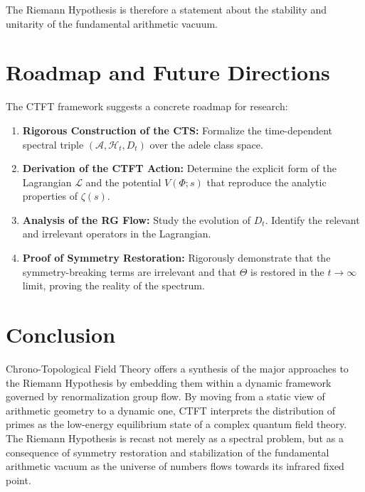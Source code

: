 \documentclass[11pt, a4paper]{article}
\theoremstyle{definition}
\newcommand{\Lagr}{\mathcal{L}}
\newcommand{\Hilb}{\mathcal{H}}
\newcommand{\Alg}{\mathscr{A}}
\begin{document}
The Riemann Hypothesis is therefore a statement about the stability and unitarity of the fundamental arithmetic vacuum.

\section{Roadmap and Future Directions}
The CTFT framework suggests a concrete roadmap for research:
\begin{enumerate}
    \item \textbf{Rigorous Construction of the CTS:} Formalize the time-dependent spectral triple $(\Alg, \Hilb_t, D_t)$ over the adele class space.
    \item \textbf{Derivation of the CTFT Action:} Determine the explicit form of the Lagrangian $\Lagr$ and the potential $V(\Phi; s)$ that reproduce the analytic properties of $\zeta(s)$.
    \item \textbf{Analysis of the RG Flow:} Study the evolution of $D_t$. Identify the relevant and irrelevant operators in the Lagrangian.
    \item \textbf{Proof of Symmetry Restoration:} Rigorously demonstrate that the symmetry-breaking terms are irrelevant and that $\Theta$ is restored in the $t\to\infty$ limit, proving the reality of the spectrum.
\end{enumerate}

\section{Conclusion}
Chrono-Topological Field Theory offers a synthesis of the major approaches to the Riemann Hypothesis by embedding them within a dynamic framework governed by renormalization group flow. By moving from a static view of arithmetic geometry to a dynamic one, CTFT interprets the distribution of primes as the low-energy equilibrium state of a complex quantum field theory. The Riemann Hypothesis is recast not merely as a spectral problem, but as a consequence of symmetry restoration and stabilization of the fundamental arithmetic vacuum as the universe of numbers flows towards its infrared fixed point.



\end{document}

